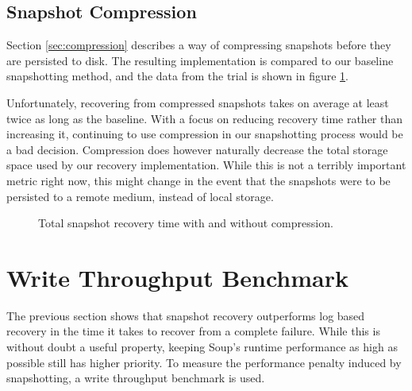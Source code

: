 \documentclass[b5paper]{report}
\begin{document}
\subsection{Snapshot Compression}
Section \ref{sec:compression} describes a way of compressing snapshots before
they are persisted to disk. The resulting implementation is compared to our
baseline snapshotting method, and the data from the trial is shown in figure
\ref{fig:compression}.

Unfortunately, recovering from compressed snapshots takes on average at least
twice as long as the baseline. With a focus on reducing recovery time rather
than increasing it, continuing to use compression in our snapshotting process
would be a bad decision. Compression does however naturally decrease the total
storage space used by our recovery implementation. While this is not a terribly
important metric right now, this might change in the event that the snapshots
were to be persisted to a remote medium, instead of local storage.

\begin{figure}[H]
  \centering

  \caption{
    Total snapshot recovery time with and without compression.
    \label{fig:compression}
  }
\end{figure}

\section{Write Throughput Benchmark}
The previous section shows that snapshot recovery outperforms log based recovery
in the time it takes to recover from a complete failure. While this is without
doubt a useful property, keeping Soup's runtime performance as high as possible
still has higher priority. To measure the performance penalty induced by
snapshotting, a write throughput benchmark is used.
\end{document}
